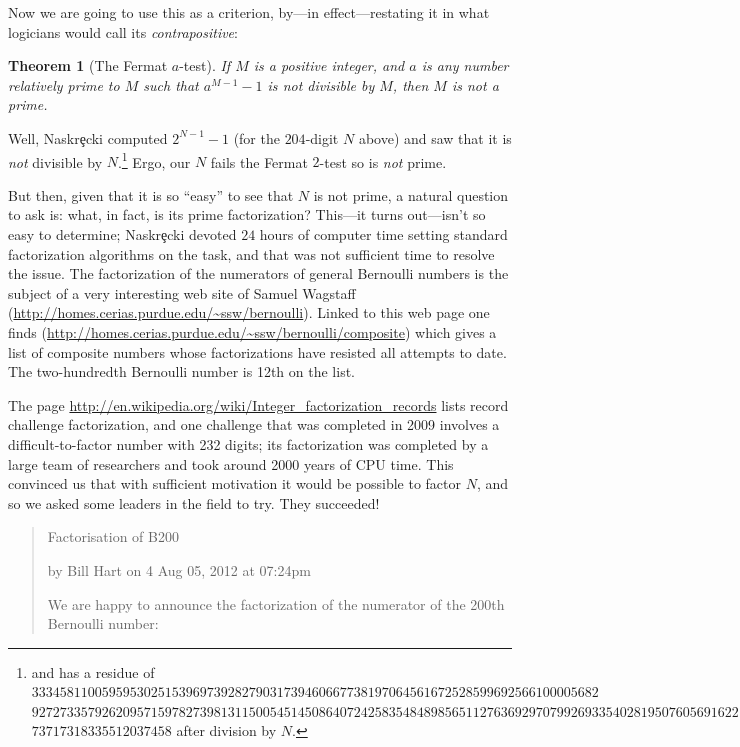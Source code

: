\documentclass[openany]{book}
\theoremstyle{plain}
\newtheorem{theorem}{Theorem}[chapter]
\theoremstyle{definition}
\begin{document}
{ Now we are going to use this as a criterion, by---in effect---restating it in what logicians would call  its {\it contrapositive}:
 \begin{theorem}[The Fermat $a$-test]
If $M$ is a positive integer, and $a$ is any number relatively prime to $M$ such that  $a^{M-1} - 1$ is {\it not} divisible by $M$, then $M$ is {\it not} a prime.
\end{theorem}

Well, Naskr\c{e}cki computed $2^{N-1}-1$  (for the $204$-digit $N$ above)   and saw that
it is {\it not} divisible by $N$.{\footnote{and has a residue of $3334581100595953025153969739282790317394606677381970645616725285996925
66100005682$\newline$92727335792620957159782739813115005451450864072425835484898
5651127636929707992693354028195076056916221$\newline$73717318335512037458$ after division by $N$.}}
Ergo, our $N$ fails the  Fermat $2$-test so is {\it not} prime.

But then, given that it is so ``easy'' to see that $N$ is not prime, a
natural question to ask is: what, in fact, is its prime factorization?
This---it turns out---isn't so easy to determine;
Naskr\c{e}cki devoted $24$ hours of computer time setting standard factorization
algorithms on the task, and that was not sufficient time to resolve
the issue.  The factorization of the numerators of general Bernoulli
numbers is the subject of a very interesting web site of Samuel
Wagstaff (\url{http://homes.cerias.purdue.edu/~ssw/bernoulli}).
Linked to this web page one finds
(\url{http://homes.cerias.purdue.edu/~ssw/bernoulli/composite}) which gives
a list of composite numbers whose factorizations have resisted all
attempts to date.  The two-hundredth Bernoulli number is 12th on the list.

 The page
\url{http://en.wikipedia.org/wiki/Integer_factorization_records} lists
record challenge factorization, and one challenge that was completed
in 2009 involves a difficult-to-factor number with 232 digits; its
factorization was completed by a large team of researchers and took around
2000 years of CPU time.  This convinced us that
with sufficient motivation  it would be possible to factor $N$, and so we
asked some leaders in the field to try.   They succeeded!
\begin{quote}\sf
Factorisation of B200

by Bill Hart on 4 Aug 05, 2012 at 07:24pm

We are happy to announce the factorization of the numerator of the 200th
Bernoulli number:


\end{quote}}
\end{document}
